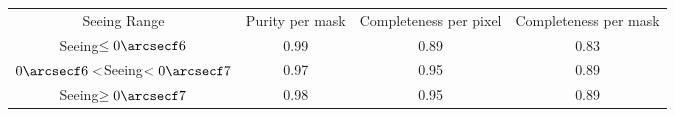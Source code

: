 \begin{table}
\begin{tabular}{cccc}
Seeing Range & Purity per mask & Completeness per pixel & Completeness per mask \\
Seeing$\leq 0\arcsecf6$ & 0.99 & 0.89 & 0.83 \\
$0\arcsecf6<$Seeing$<0\arcsecf7$ & 0.97 & 0.95 & 0.89 \\
Seeing$\geq0\arcsecf7$ & 0.98 & 0.95 & 0.89 \\
\end{tabular}
\end{table}
